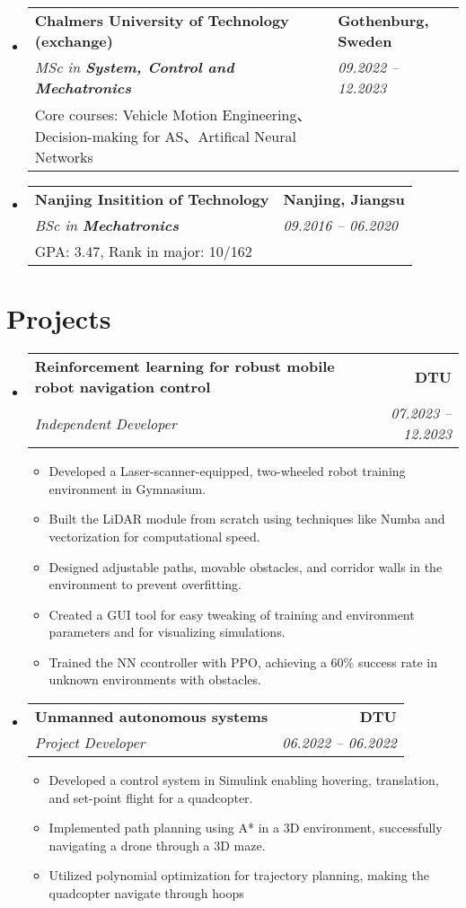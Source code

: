 \documentclass[letterpaper,11pt]{article}
\makeatletter
\newcommand{\resumeItem}[1]{
  \item\small{
    {#1 \vspace{-2pt}}
  }
}
\newcommand{\resumeSubheading}[4]{
  \vspace{-2pt}\item\small{
    \begin{tabular*}{0.97\textwidth}[t]{l@{\extracolsep{\fill}}r}
      \textbf{#1} & \textbf{#2} \\
      \textit{#3} & \textit{#4} \\
    \end{tabular*}\vspace{-7pt}
  }
}
\newcommand{\resumeSubheadingExtended}[5]{  
  \item\small{
    \begin{tabular*}{0.97\textwidth}{@{}p{0.8\textwidth}p{0.52\textwidth}@{}}
      \textbf{#1} & \textbf{#2} \\  %
      \textit{#3} & \textit{#4} \\  %
      #5 &  %
    \end{tabular*}\vspace{-10pt}
  }
}
\newcommand{\resumeSubHeadingListStart}{\begin{itemize}[leftmargin=0.15in, label={}]}
\newcommand{\resumeSubHeadingListEnd}{\end{itemize}}
\newcommand{\resumeItemListStart}{\begin{itemize}}
\newcommand{\resumeItemListEnd}{\end{itemize}\vspace{-5pt}}
\makeatother
\begin{document}
  \vspace{0.5mm} %

  \resumeSubHeadingListStart
    \resumeSubheadingExtended
      {Chalmers University of Technology (exchange)}{Gothenburg, Sweden}
      {MSc in \textbf{System, Control and Mechatronics}}{09.2022 -- 12.2023}
      {Core courses: Vehicle Motion Engineering、Decision-making for AS、Artifical Neural Networks}
  \resumeSubHeadingListEnd
  
  \vspace{0.5mm} %

  \resumeSubHeadingListStart
    \resumeSubheadingExtended
      {Nanjing Insitition of Technology}{Nanjing, Jiangsu}
      {BSc in \textbf{Mechatronics}}{09.2016 -- 06.2020}
      {GPA: 3.47, Rank in major: 10/162}
  \resumeSubHeadingListEnd

\section{Projects}
  \resumeSubHeadingListStart

    \resumeSubheading
      {\textbf{Reinforcement learning for robust
      mobile robot navigation control \; \href{https://1drv.ms/v/s!Al-YZOpjHxorgslaTIu4oeTj8TYROw?e=EflSJj}{\faVideoCamera} \;  \href{https://github.com/SpartanTan/RLATR}{\faGithub}}}{DTU}
      {Independent Developer}{07.2023 -- 12.2023}
      \resumeItemListStart
        \resumeItem{Developed a Laser-scanner-equipped, two-wheeled robot training environment in Gymnasium.} 
        \resumeItem{Built the LiDAR module from scratch using techniques like Numba and vectorization for computational speed.} 
        \resumeItem{Designed adjustable paths, movable obstacles, and corridor walls in the environment to prevent overfitting.} 
        \resumeItem{Created a GUI tool for easy tweaking of training and environment parameters and for visualizing simulations.} \resumeItem{Trained the NN ccontroller with PPO, achieving a 60\% success rate in unknown environments with obstacles.}
      \resumeItemListEnd
      
    \resumeSubheading
      {\textbf{Unmanned autonomous systems \; \href{https://1drv.ms/v/s!Al-YZOpjHxorgslZm5SJR7mVF_eoPw?e=4kRkvd}{\faVideoCamera} \;  \href{https://github.com/SpartanTan/31390-UAS-2022}{\faGithub}}}{DTU}
      {Project Developer}{06.2022 -- 06.2022}
      \resumeItemListStart
      \resumeItem{Developed a control system in Simulink enabling hovering, translation, and set-point flight for a quadcopter.} 
      \resumeItem{Implemented path planning using A* in a 3D environment, successfully navigating a drone through a 3D maze.} 
      \resumeItem{Utilized polynomial optimization for trajectory planning, making the quadcopter navigate through hoops}
      \resumeItemListEnd
  \resumeSubHeadingListEnd
\end{document}

